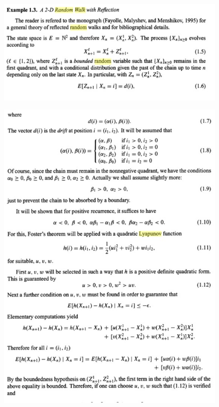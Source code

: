\begin{figure}[H]
\centering
\includegraphics[width=\textwidth]{week12/f_1}
\end{figure}
\begin{figure}[H]
\centering
\includegraphics[width=\textwidth]{week12/f_2}
\end{figure}
